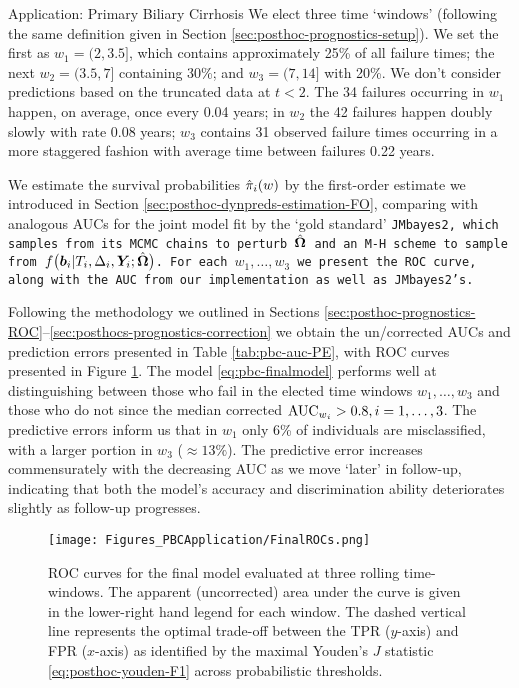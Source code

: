 \begin{chapter}{\label{cha:app-PBC}Application: Primary Biliary Cirrhosis}
  We elect three time `windows' (following the same definition given in Section \ref{sec:posthoc-prognostics-setup}). We set the first as $w_1=(2,3.5]$, which contains approximately 25\% of all failure times; the next $w_2=(3.5,7]$ containing 30\%; and $w_3=(7,14]$ with 20\%. We don't consider predictions based on the truncated data at $t<2$. The 34 failures occurring in $w_1$ happen, on average, once every 0.04 years; in $w_2$ the 42 failures happen doubly slowly with rate 0.08 years; $w_3$ contains 31 observed failure times occurring in a more staggered fashion with average time between failures 0.22 years.
  
  We estimate the survival probabilities $\hat{\pi}_i\!\left( w\right)$ by the first-order estimate we introduced in Section \ref{sec:posthoc-dynpreds-estimation-FO}, comparing with analogous AUCs for the joint model fit by the `gold standard' \tt{JMbayes2}, which samples from its MCMC chains to perturb $\hat{\bm{\Omega}}$ and an M-H scheme to sample from $f\big(\bm{b}_i|T_i, \Delta_i, \bm{Y}_i; \hat{\bm{\Omega}}\big)$. For each $w_1,\dots,w_3$ we present the ROC curve, along with the AUC from our implementation as well as \tt{JMbayes2}'s.

  Following the methodology we outlined in Sections \ref{sec:posthoc-prognostics-ROC}--\ref{sec:posthocs-prognostics-correction} we obtain the un/corrected AUCs and prediction errors presented in Table \ref{tab:pbc-auc-PE}, with ROC curves presented in Figure \ref{fig:pbc-final-roc}. The model \eqref{eq:pbc-finalmodel} performs well at distinguishing between those who fail in the elected time windows $w_1,\dots,w_3$ and those who do not since the median corrected $\mathrm{AUC}_{w{_i}}>0.8, i=1,\dots,3$. The predictive errors inform us that in $w_1$ only 6\% of individuals are misclassified, with a larger portion in $w_3$ ($\approx13\%$). The predictive error increases commensurately with the decreasing AUC as we move `later' in follow-up, indicating that both the model's accuracy and discrimination ability deteriorates slightly as follow-up progresses.
  
  \begin{figure}[ht]
      \centering
      \texttt{[image: Figures\_PBCApplication/FinalROCs.png]}
      \caption{ROC curves for the final model evaluated at three rolling time-windows. The apparent (\ie uncorrected) area under the curve is given in the lower-right hand legend for each window. The dashed vertical line represents the optimal trade-off between the TPR ($y$-axis) and FPR ($x$-axis) as identified by the maximal Youden's $J$ statistic \eqref{eq:posthoc-youden-F1} across probabilistic thresholds.}
      \label{fig:pbc-final-roc}
  \end{figure}
  

\end{chapter}
